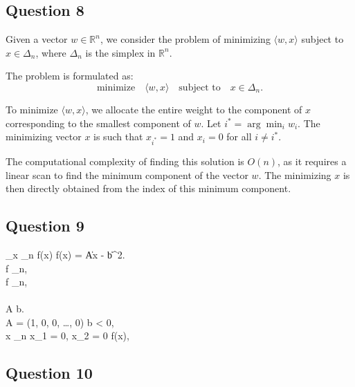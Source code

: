 \documentclass[12p]{article}
\begin{document}
\subsection*{Question 8} 


Given a vector \( w \in \mathbb{R}^n \), we consider the problem of minimizing \( \langle w, x \rangle \) subject to \( x \in \Delta_n \), where \( \Delta_n \) is the simplex in \( \mathbb{R}^n \).

The problem is formulated as:
\[ \text{minimize} \quad \langle w, x \rangle \quad \text{subject to} \quad x \in \Delta_n. \]

To minimize \( \langle w, x \rangle \), we allocate the entire weight to the component of \( x \) corresponding to the smallest component of \( w \). Let \( i^* = \arg \min_i w_i \). The minimizing vector \( x \) is such that \( x_{i^*} = 1 \) and \( x_i = 0 \) for all \( i \neq i^* \).


The computational complexity of finding this solution is \( O(n) \), as it requires a linear scan to find the minimum component of the vector \( w \). The minimizing \( x \) is then directly obtained from the index of this minimum component.


\subsection*{Question 9} 
 \min_{x \in \Delta_n} f(x)  f(x) =  \|Ax - b\|^2. \\
 f  \Delta_n, \\
 f  \Delta_n, \\
 \\
 A  b. \\
 A = (1, 0, 0, \ldots, 0)  b < 0, \\
 x \in \Delta_n  x_1 = 0, x_2 = 0  f(x), \\


\subsection*{Question 10} 
\end{document}

